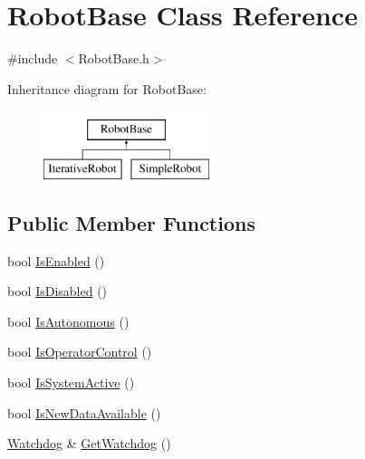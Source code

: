 \hypertarget{classRobotBase}{
\section{RobotBase Class Reference}
\label{classRobotBase}
}


{\ttfamily \#include $<$RobotBase.h$>$}

Inheritance diagram for RobotBase:\begin{figure}[H]
\begin{center}
\leavevmode
\includegraphics[height=2.000000cm]{classRobotBase}
\end{center}
\end{figure}
\subsection*{Public Member Functions}
\begin{DoxyCompactItemize}
\item 
bool \hyperlink{classRobotBase_a597e7b256dd4a950ff25e1823df5f2ae}{IsEnabled} ()
\item 
bool \hyperlink{classRobotBase_a75fb5e396eaee765e65d3bf24d5c2a08}{IsDisabled} ()
\item 
bool \hyperlink{classRobotBase_a9eac80c5e53650e1e3e26e7b5f8cb5aa}{IsAutonomous} ()
\item 
bool \hyperlink{classRobotBase_a05c699856acfe35b0ffb2172c39e23de}{IsOperatorControl} ()
\item 
bool \hyperlink{classRobotBase_aa1e72e03aece3b789a65aa1b2d0f6ab7}{IsSystemActive} ()
\item 
bool \hyperlink{classRobotBase_aab2d7bd7aeb6567097498284a9509ecb}{IsNewDataAvailable} ()
\item 
\hyperlink{classWatchdog}{Watchdog} \& \hyperlink{classRobotBase_a2d6b5704b1f1de8ec4a78db9ee64d2d2}{GetWatchdog} ()
\end{DoxyCompactItemize}
